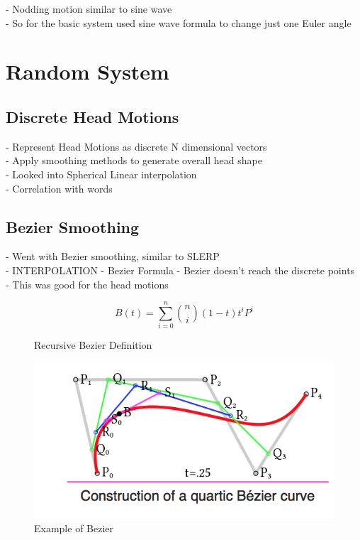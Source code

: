 \documentclass[bsc,frontabs,twoside,singlespacing,parskip]{infthesis}
\begin{document}
- Nodding motion similar to sine wave \\
- So for the basic system used sine wave formula to change just one Euler angle \\

\section{Random System}

\subsection{Discrete Head Motions}
- Represent Head Motions as discrete N dimensional vectors \\
- Apply smoothing methods to generate overall head shape \\
- Looked into Spherical Linear interpolation \\
\cite{rigid_head_motion}
- Correlation with words


\subsection{Bezier Smoothing}

- Went with Bezier smoothing, similar to SLERP\\
- INTERPOLATION
- Bezier Formula
- Bezier doesn't reach the discrete points\\
- This was good for the head motions \\

\begin{figure}
	$$ B(t) = \sum_{i=0}^n {n \choose i} (1-t) t^i P^i $$
	\caption{Recursive Bezier Definition} 
\end{figure}

\begin{figure}
	\includegraphics[width=1\textwidth]{bezier_example.png}
	\caption{Example of Bezier}
\end{figure}
\end{document}
